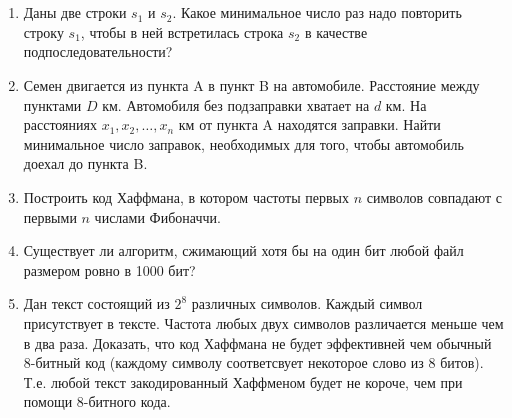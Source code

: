 \section{}

\begin{enumerate}

  \item Даны две строки $s_1$ и $s_2$. Какое минимальное 
  число раз надо повторить строку $s_1$, чтобы в ней встретилась
  строка $s_2$ в качестве подпоследовательности?

  \item Семен двигается из пункта A в пункт B на автомобиле.
  Расстояние между пунктами $D$ км. Автомобиля без подзаправки
  хватает на $d$ км. На расстояниях $x_1, x_2, \dots, x_n$ км 
  от пункта A находятся заправки. Найти минимальное число
  заправок, необходимых для того, чтобы автомобиль доехал
  до пункта B.

  \item Построить код Хаффмана, в котором частоты первых $n$
  символов совпадают с первыми $n$ числами Фибоначчи.

  \item Существует ли алгоритм, сжимающий хотя бы на один бит
  любой файл размером ровно в 1000 бит?

  \item Дан текст состоящий из $2^8$ различных символов. Каждый 
  символ присутствует в тексте. Частота любых двух символов 
  различается меньше чем в два раза. Доказать, что код Хаффмана
  не будет эффективней чем обычный 8-битный код (каждому символу
  соответсвует некоторое слово из 8 битов). Т.е. любой текст
  закодированный Хаффменом будет не короче, чем при помощи 8-битного
  кода.

\end{enumerate}


